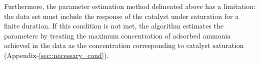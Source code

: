 \par Furthermore, the parameter estimation method delineated above has a limitation: the data set must include the response of the catalyst under saturation for a finite duration. If this condition is not met, the algorithm estimates the parameters by treating the maximum concentration of adsorbed ammonia achieved in the data as the concentration corresponding to catalyst saturation (Appendix-\ref{sec::necessary_cond}).
